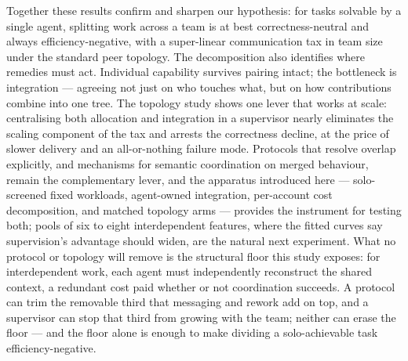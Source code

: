 \documentclass[11pt,a4paper]{article}
\begin{document}
Together these results confirm and sharpen our hypothesis: for tasks solvable by a single agent, splitting work across a team is at best correctness-neutral and always efficiency-negative, with a super-linear communication tax in team size under the standard peer topology. The decomposition also identifies where remedies must act. Individual capability survives pairing intact; the bottleneck is integration --- agreeing not just on who touches what, but on how contributions combine into one tree. The topology study shows one lever that works at scale: centralising both allocation and integration in a supervisor nearly eliminates the scaling component of the tax and arrests the correctness decline, at the price of slower delivery and an all-or-nothing failure mode. Protocols that resolve overlap explicitly, and mechanisms for semantic coordination on merged behaviour, remain the complementary lever, and the apparatus introduced here --- solo-screened fixed workloads, agent-owned integration, per-account cost decomposition, and matched topology arms --- provides the instrument for testing both; pools of six to eight interdependent features, where the fitted curves say supervision's advantage should widen, are the natural next experiment. What no protocol or topology will remove is the structural floor this study exposes: for interdependent work, each agent must independently reconstruct the shared context, a redundant cost paid whether or not coordination succeeds. A protocol can trim the removable third that messaging and rework add on top, and a supervisor can stop that third from growing with the team; neither can erase the floor --- and the floor alone is enough to make dividing a solo-achievable task efficiency-negative.
\newpage
%
%
% 
% 

\end{document}
